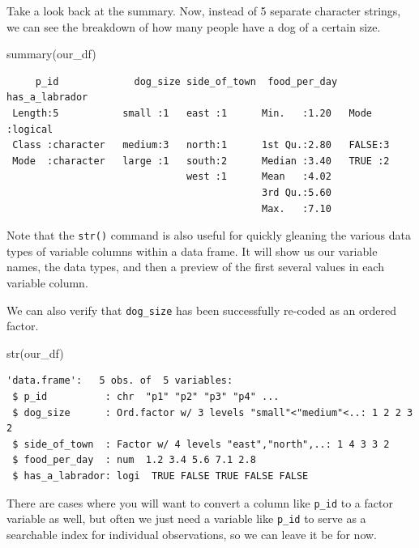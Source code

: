 \documentclass[
  letterpaper,
  DIV=11,
  numbers=noendperiod]{scrreprt}
\newenvironment{Shaded}{\begin{snugshade}}{\end{snugshade}}
\newcommand{\FunctionTok}[1]{\textcolor[rgb]{0.28,0.35,0.67}{#1}}
\newcommand{\NormalTok}[1]{\textcolor[rgb]{0.00,0.23,0.31}{#1}}
\begin{document}
Take a look back at the summary. Now, instead of 5 separate character
strings, we can see the breakdown of how many people have a dog of a
certain size.

\begin{Shaded}
\begin{Highlighting}[]
\FunctionTok{summary}\NormalTok{(our\_df)}
\end{Highlighting}
\end{Shaded}

\begin{verbatim}
     p_id             dog_size side_of_town  food_per_day  has_a_labrador 
 Length:5           small :1   east :1      Min.   :1.20   Mode :logical  
 Class :character   medium:3   north:1      1st Qu.:2.80   FALSE:3        
 Mode  :character   large :1   south:2      Median :3.40   TRUE :2        
                               west :1      Mean   :4.02                  
                                            3rd Qu.:5.60                  
                                            Max.   :7.10                  
\end{verbatim}

Note that the \texttt{str()} command is also useful for quickly gleaning
the various data types of variable columns within a data frame. It will
show us our variable names, the data types, and then a preview of the
first several values in each variable column.

We can also verify that \texttt{dog\_size} has been successfully
re-coded as an ordered factor.

\begin{Shaded}
\begin{Highlighting}[]
\FunctionTok{str}\NormalTok{(our\_df)}
\end{Highlighting}
\end{Shaded}

\begin{verbatim}
'data.frame':   5 obs. of  5 variables:
 $ p_id          : chr  "p1" "p2" "p3" "p4" ...
 $ dog_size      : Ord.factor w/ 3 levels "small"<"medium"<..: 1 2 2 3 2
 $ side_of_town  : Factor w/ 4 levels "east","north",..: 1 4 3 3 2
 $ food_per_day  : num  1.2 3.4 5.6 7.1 2.8
 $ has_a_labrador: logi  TRUE FALSE TRUE FALSE FALSE
\end{verbatim}

There are cases where you will want to convert a column like
\texttt{p\_id} to a factor variable as well, but often we just need a
variable like \texttt{p\_id} to serve as a searchable index for
individual observations, so we can leave it be for now.
\end{document}
